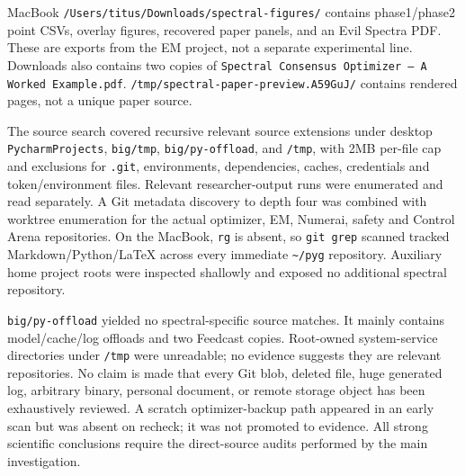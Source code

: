 \documentclass[
  british,
  10pt,
  a4paper,
]{article}
\begin{document}
MacBook
\texttt{/\allowbreak{}Users/\allowbreak{}titus/\allowbreak{}Downloads/\allowbreak{}spectral-\allowbreak{}figures/\allowbreak{}}
contains phase1/\allowbreak{}phase2 point CSVs, overlay figures,
recovered paper panels, and an Evil Spectra PDF. These are exports from
the EM project, not a separate experimental line. Downloads also
contains two copies of
\texttt{Spectral \allowbreak{}Consensus \allowbreak{}Optimizer \allowbreak{}— \allowbreak{}A \allowbreak{}Worked \allowbreak{}Example.\allowbreak{}pdf}.
\texttt{/\allowbreak{}tmp/\allowbreak{}spectral-\allowbreak{}paper-\allowbreak{}preview.\allowbreak{}A59GuJ/\allowbreak{}}
contains rendered pages, not a unique paper source.

The source search covered recursive relevant source extensions under
desktop \texttt{PycharmProje\allowbreak{}cts}, \texttt{big/tmp},
\texttt{big/\allowbreak{}py-\allowbreak{}offload}, and \texttt{/tmp},
with 2MB per-file cap and exclusions for \texttt{.git},
environments\allowbreak{},\allowbreak{}
dependencies\allowbreak{},\allowbreak{} caches, credentials and
token/\allowbreak{}environment files. Relevant
researcher-\allowbreak{}output runs were enumerated and read
separately.\allowbreak{} A Git metadata discovery to depth four was
combined with worktree enumeration for the actual optimizer, EM,
Numerai, safety and Control Arena
repositories\allowbreak{}.\allowbreak{} On the MacBook, \texttt{rg} is
absent, so \texttt{git\ grep} scanned tracked
Markdown/\allowbreak{}Python/\allowbreak{}LaTeX across every immediate
\texttt{\textasciitilde{}/pyg} repository.\allowbreak{} Auxiliary home
project roots were inspected shallowly and exposed no additional
spectral repository.\allowbreak{}

\texttt{big/\allowbreak{}py-\allowbreak{}offload} yielded no
spectral-\allowbreak{}specific source matches. It mainly contains
model/\allowbreak{}cache/\allowbreak{}log offloads and two Feedcast
copies. Root-owned system-\allowbreak{}service directories under
\texttt{/tmp} were unreadable; no evidence suggests they are relevant
repositories\allowbreak{}.\allowbreak{} No claim is made that every Git
blob, deleted file, huge generated log, arbitrary binary, personal
document, or remote storage object has been exhaustively reviewed. A
scratch optimizer-\allowbreak{}backup path appeared in an early scan but
was absent on recheck; it was not promoted to evidence. All strong
scientific conclusions require the direct-\allowbreak{}source audits
performed by the main investigatio\allowbreak{}n.\allowbreak{}
\end{document}
